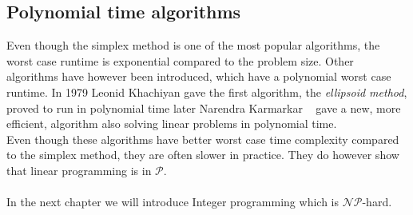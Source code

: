 \subsection{Polynomial time algorithms}
Even though the simplex method is one of the most popular algorithms, the worst case runtime is exponential compared to the problem size. Other algorithms have however been introduced, which have a polynomial worst case runtime. In 1979 Leonid Khachiyan \cite{khachiyan1980polynomial} gave the first algorithm, the \textit{ellipsoid method}, proved to run in polynomial time later Narendra Karmarkar ~\cite{karmarkar1984new} gave a new, more efficient, algorithm also solving linear problems in polynomial time.
\\ Even though these algorithms have better worst case time complexity compared to the simplex method, they are often slower in practice. They do however show that linear programming is in $\mathcal{P}$.
\\\\ In the next chapter we will introduce Integer programming which is $\mathcal{NP}$-hard.